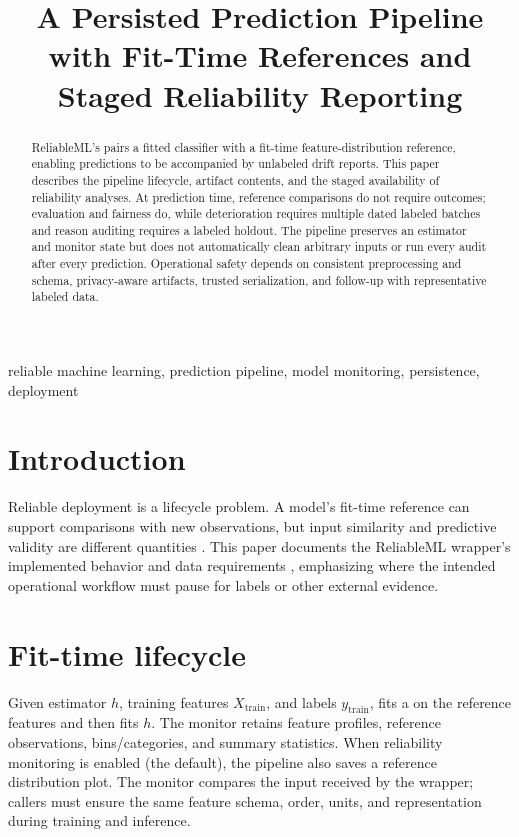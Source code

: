 \documentclass[conference]{IEEEtran}
\title{A Persisted Prediction Pipeline with Fit-Time References and Staged Reliability Reporting}
\author{
\jabulaniauthor
\and
\martinchanzauthor
\and
\oloratoauthor
\and
\mfundoauthor
}
\begin{document}
\maketitle

\begin{abstract}
ReliableML's  pairs a fitted classifier with a fit-time feature-distribution reference, enabling predictions to be accompanied by unlabeled drift reports. This paper describes the pipeline lifecycle, artifact contents, and the staged availability of reliability analyses. At prediction time, reference comparisons do not require outcomes; evaluation and fairness do, while deterioration requires multiple dated labeled batches and reason auditing requires a labeled holdout. The pipeline preserves an estimator and monitor state but does not automatically clean arbitrary inputs or run every audit after every prediction. Operational safety depends on consistent preprocessing and schema, privacy-aware artifacts, trusted serialization, and follow-up with representative labeled data.
\end{abstract}

\begin{IEEEkeywords}
reliable machine learning, prediction pipeline, model monitoring, persistence, deployment
\end{IEEEkeywords}

\section{Introduction}
Reliable deployment is a lifecycle problem. A model's fit-time reference can support comparisons with new observations, but input similarity and predictive validity are different quantities \cite{gama2014}. This paper documents the ReliableML wrapper's implemented behavior and data requirements \cite{nist2023,software}, emphasizing where the intended operational workflow must pause for labels or other external evidence.

\section{Fit-time lifecycle}
Given estimator \(h\), training features \(X_{\mathrm{train}}\), and labels \(y_{\mathrm{train}}\),  fits a  on the reference features and then fits \(h\). The monitor retains feature profiles, reference observations, bins/categories, and summary statistics. When reliability monitoring is enabled (the default), the pipeline also saves a reference distribution plot. The monitor compares the input received by the wrapper; callers must ensure the same feature schema, order, units, and representation during training and inference.
\end{document}
